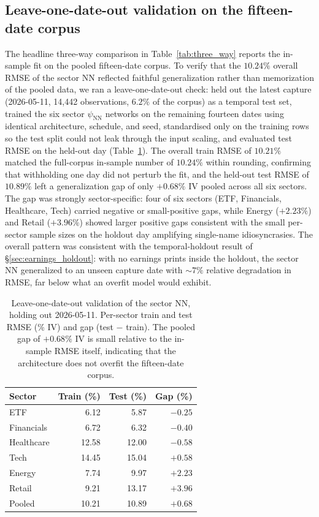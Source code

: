 \subsection{Leave-one-date-out validation on the fifteen-date corpus}\label{sec:supp_loo}

The headline three-way comparison in Table~\ref{tab:three_way} reports the in-sample fit on the pooled fifteen-date corpus. To verify that the $10.24\%$ overall RMSE of the sector NN reflected faithful generalization rather than memorization of the pooled data, we ran a leave-one-date-out check: held out the latest capture (2026-05-11, 14{,}442 observations, $6.2\%$ of the corpus) as a temporal test set, trained the six sector $\psi_{\text{NN}}$ networks on the remaining fourteen dates using identical architecture, schedule, and seed, standardised only on the training rows so the test split could not leak through the input scaling, and evaluated test RMSE on the held-out day (Table~\ref{tab:loo_sector_nn}). The overall train RMSE of $10.21\%$ matched the full-corpus in-sample number of $10.24\%$ within rounding, confirming that withholding one day did not perturb the fit, and the held-out test RMSE of $10.89\%$ left a generalization gap of only $+0.68\%$ IV pooled across all six sectors. The gap was strongly sector-specific: four of six sectors (ETF, Financials, Healthcare, Tech) carried negative or small-positive gaps, while Energy ($+2.23\%$) and Retail ($+3.96\%$) showed larger positive gaps consistent with the small per-sector sample sizes on the holdout day amplifying single-name idiosyncrasies. The overall pattern was consistent with the temporal-holdout result of §\ref{sec:earnings_holdout}: with no earnings prints inside the holdout, the sector NN generalized to an unseen capture date with $\sim 7\%$ relative degradation in RMSE, far below what an overfit model would exhibit.

\begin{table}[ht]
\centering
\caption{Leave-one-date-out validation of the sector NN, holding out 2026-05-11. Per-sector train and test RMSE (\% IV) and gap (test $-$ train). The pooled gap of $+0.68\%$ IV is small relative to the in-sample RMSE itself, indicating that the architecture does not overfit the fifteen-date corpus.}\label{tab:loo_sector_nn}
\begin{tabular}{lrrr}
\toprule
Sector & Train (\%) & Test (\%) & Gap (\%) \\
\midrule
ETF        &  6.12 &  5.87 & $-0.25$ \\
Financials &  6.72 &  6.32 & $-0.40$ \\
Healthcare & 12.58 & 12.00 & $-0.58$ \\
Tech       & 14.45 & 15.04 & $+0.58$ \\
Energy     &  7.74 &  9.97 & $+2.23$ \\
Retail     &  9.21 & 13.17 & $+3.96$ \\
\midrule
Pooled     & 10.21 & 10.89 & $+0.68$ \\
\bottomrule
\end{tabular}
\end{table}


